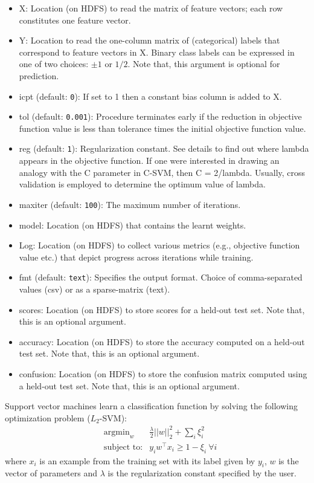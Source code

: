 \begin{itemize}
\item X: Location (on HDFS) to read the matrix of feature vectors; 
each row constitutes one feature vector.
\item Y: Location to read the one-column matrix of (categorical) 
labels that correspond to feature vectors in X. Binary class labels 
can be expressed in one of two choices: $\pm 1$ or $1/2$. Note that,
this argument is optional for prediction.
\item icpt (default: {\tt 0}): If set to 1 then a constant bias column is 
added to X. 
\item tol (default: {\tt 0.001}): Procedure terminates early if the reduction
in objective function value is less than tolerance times the initial objective
function value.
\item reg (default: {\tt 1}): Regularization constant. See details to find 
out where lambda appears in the objective function. If one were interested 
in drawing an analogy with the C parameter in C-SVM, then C = 2/lambda. 
Usually, cross validation is employed to determine the optimum value of 
lambda.
\item maxiter (default: {\tt 100}): The maximum number of iterations.
\item model: Location (on HDFS) that contains the learnt weights.
\item Log: Location (on HDFS) to collect various metrics (e.g., objective 
function value etc.) that depict progress across iterations while training.
\item fmt (default: {\tt text}): Specifies the output format. Choice of 
comma-separated values (csv) or as a sparse-matrix (text).
\item scores: Location (on HDFS) to store scores for a held-out test set.
Note that, this is an optional argument.
\item accuracy: Location (on HDFS) to store the accuracy computed on a
held-out test set. Note that, this is an optional argument.
\item confusion: Location (on HDFS) to store the confusion matrix
computed using a held-out test set. Note that, this is an optional 
argument.
\end{itemize}


Support vector machines learn a classification function by solving the
following optimization problem ($L_2$-SVM):
\begin{eqnarray*}
&\textrm{argmin}_w& \frac{\lambda}{2} ||w||_2^2 + \sum_i \xi_i^2\\
&\textrm{subject to:}& y_i w^{\top} x_i \geq 1 - \xi_i ~ \forall i
\end{eqnarray*}
where $x_i$ is an example from the training set with its label given by $y_i$, 
$w$ is the vector of parameters and $\lambda$ is the regularization constant 
specified by the user.

